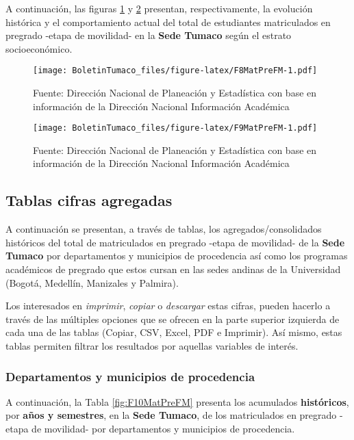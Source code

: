 \documentclass[
]{book}
\begin{document}
A continuación, las figuras \ref{fig:F8MatPreFM} y \ref{fig:F9MatPreFM} presentan, respectivamente, la evolución histórica y el comportamiento actual del total de estudiantes matriculados en pregrado -etapa de movilidad- en la \textbf{Sede Tumaco} según el estrato socioeconómico.

\begin{figure}
\centering
\texttt{[image: BoletinTumaco\_files/figure-latex/F8MatPreFM-1.pdf]}
\caption{\label{fig:F8MatPreFM}Fuente: Dirección Nacional de Planeación y Estadística con base en información de la Dirección Nacional Información Académica}
\end{figure}

\begin{figure}
\centering
\texttt{[image: BoletinTumaco\_files/figure-latex/F9MatPreFM-1.pdf]}
\caption{\label{fig:F9MatPreFM}Fuente: Dirección Nacional de Planeación y Estadística con base en información de la Dirección Nacional Información Académica}
\end{figure}

\hypertarget{tablas-cifras-agregadas-4}{%
\subsection{Tablas cifras agregadas}\label{tablas-cifras-agregadas-4}}

A continuación se presentan, a través de tablas, los agregados/consolidados históricos del total de matriculados en pregrado -etapa de movilidad- de la \textbf{Sede Tumaco} por departamentos y municipios de procedencia así como los programas académicos de pregrado que estos cursan en las sedes andinas de la Universidad (Bogotá, Medellín, Manizales y Palmira).

Los interesados en \emph{imprimir}, \emph{copiar} o \emph{descargar} estas cifras, pueden hacerlo a través de las múltiples opciones que se ofrecen en la parte superior izquierda de cada una de las tablas (Copiar, CSV, Excel, PDF e Imprimir). Así mismo, estas tablas permiten filtrar los resultados por aquellas variables de interés.

\hypertarget{departamentos-y-municipios-de-procedencia-3}{%
\subsubsection{Departamentos y municipios de procedencia}\label{departamentos-y-municipios-de-procedencia-3}}

A continuación, la Tabla \ref{fig:F10MatPreFM} presenta los acumulados \textbf{históricos}, por \textbf{años y semestres}, en la \textbf{Sede Tumaco}, de los matriculados en pregrado -etapa de movilidad- por departamentos y municipios de procedencia.
\end{document}
